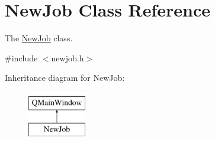 \hypertarget{class_new_job}{}\section{New\+Job Class Reference}
\label{class_new_job}


The \mbox{\hyperlink{class_new_job}{New\+Job}} class.  




{\ttfamily \#include $<$newjob.\+h$>$}

Inheritance diagram for New\+Job\+:\begin{figure}[H]
\begin{center}
\leavevmode
\includegraphics[height=2.000000cm]{class_new_job}
\end{center}
\end{figure}
